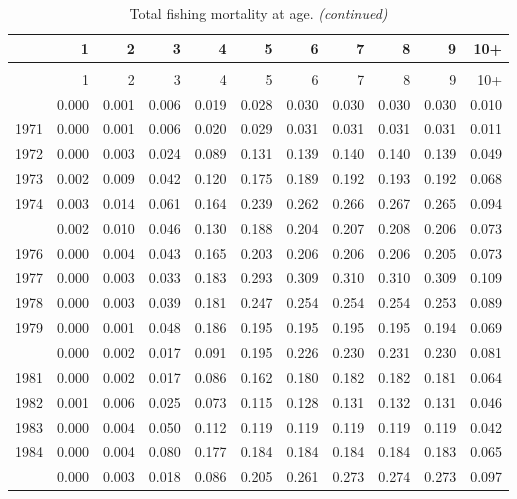 \documentclass[
]{article}
\begin{document}
\begin{longtable}[t]{lrrrrrrrrrr}
\caption{\label{tab:FAA-tot-table}Total fishing mortality at age.}\\
\toprule
  & 1 & 2 & 3 & 4 & 5 & 6 & 7 & 8 & 9 & 10+\\
\midrule
\endfirsthead
\caption[]{Total fishing mortality at age. \textit{(continued)}}\\
\toprule
  & 1 & 2 & 3 & 4 & 5 & 6 & 7 & 8 & 9 & 10+\\
\midrule
\endhead

\endfoot
\bottomrule
\endlastfoot
1970 & 0.000 & 0.001 & 0.006 & 0.019 & 0.028 & 0.030 & 0.030 & 0.030 & 0.030 & 0.010\\
1971 & 0.000 & 0.001 & 0.006 & 0.020 & 0.029 & 0.031 & 0.031 & 0.031 & 0.031 & 0.011\\
1972 & 0.000 & 0.003 & 0.024 & 0.089 & 0.131 & 0.139 & 0.140 & 0.140 & 0.139 & 0.049\\
1973 & 0.002 & 0.009 & 0.042 & 0.120 & 0.175 & 0.189 & 0.192 & 0.193 & 0.192 & 0.068\\
1974 & 0.003 & 0.014 & 0.061 & 0.164 & 0.239 & 0.262 & 0.266 & 0.267 & 0.265 & 0.094\\
\addlinespace
1975 & 0.002 & 0.010 & 0.046 & 0.130 & 0.188 & 0.204 & 0.207 & 0.208 & 0.206 & 0.073\\
1976 & 0.000 & 0.004 & 0.043 & 0.165 & 0.203 & 0.206 & 0.206 & 0.206 & 0.205 & 0.073\\
1977 & 0.000 & 0.003 & 0.033 & 0.183 & 0.293 & 0.309 & 0.310 & 0.310 & 0.309 & 0.109\\
1978 & 0.000 & 0.003 & 0.039 & 0.181 & 0.247 & 0.254 & 0.254 & 0.254 & 0.253 & 0.089\\
1979 & 0.000 & 0.001 & 0.048 & 0.186 & 0.195 & 0.195 & 0.195 & 0.195 & 0.194 & 0.069\\
\addlinespace
1980 & 0.000 & 0.002 & 0.017 & 0.091 & 0.195 & 0.226 & 0.230 & 0.231 & 0.230 & 0.081\\
1981 & 0.000 & 0.002 & 0.017 & 0.086 & 0.162 & 0.180 & 0.182 & 0.182 & 0.181 & 0.064\\
1982 & 0.001 & 0.006 & 0.025 & 0.073 & 0.115 & 0.128 & 0.131 & 0.132 & 0.131 & 0.046\\
1983 & 0.000 & 0.004 & 0.050 & 0.112 & 0.119 & 0.119 & 0.119 & 0.119 & 0.119 & 0.042\\
1984 & 0.000 & 0.004 & 0.080 & 0.177 & 0.184 & 0.184 & 0.184 & 0.184 & 0.183 & 0.065\\
\addlinespace
1985 & 0.000 & 0.003 & 0.018 & 0.086 & 0.205 & 0.261 & 0.273 & 0.274 & 0.273 & 0.097\\

\end{longtable}
\end{document}
